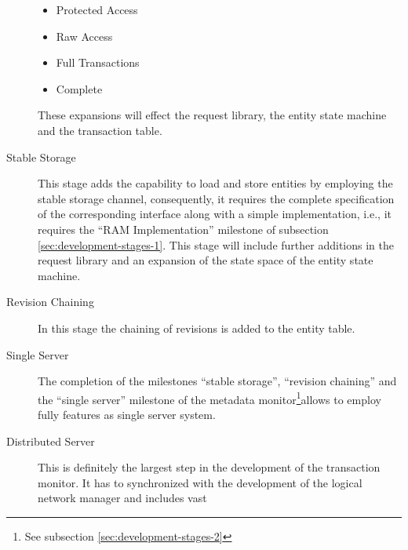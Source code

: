 \documentclass[a4paper, 10pt]{book}
\begin{document}
\begin{description}
\begin{itemize}
                                            \item Protected Access
                                            \item Raw Access
                                            \item Full Transactions
                                            \item Complete
                                        \end{itemize}
                                        These expansions will effect the request library, the entity state
                                        machine and the transaction table.
                                    \item[Stable Storage] This stage adds the capability to load and store
                                        entities by employing the stable storage channel, consequently, it
                                        requires the complete specification of the corresponding interface
                                        along with a simple implementation, i.e., it requires the ``RAM
                                        Implementation'' milestone of subsection
                                        \vref{sec:development-stages-1}. This stage will include further
                                        additions in the request library and an expansion of the state space
                                        of the entity state machine.
                                    \item[Revision Chaining] In this stage the chaining of revisions is
                                        added to the entity table. 
                                    \item[Single Server] The completion of the milestones ``stable
                                        storage'', ``revision chaining'' and the ``single server''
                                        milestone of the metadata monitor\footnote{See subsection
                                        \vref{sec:development-stages-2} }allows to employ \SYNEIGHT fully
                                        features as single server system.
                                    \item[Distributed Server] This is definitely the largest step in the
                                        development of the transaction monitor. It has to synchronized with
                                        the development of the logical network manager and includes vast

\end{description}
\end{document}
